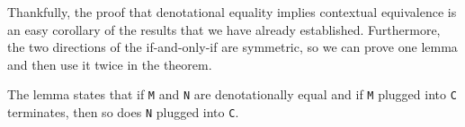 Thankfully, the proof that denotational equality implies contextual
equivalence is an easy corollary of the results that we have already
established. Furthermore, the two directions of the if-and-only-if are
symmetric, so we can prove one lemma and then use it twice in the
theorem.

The lemma states that if \texttt{M} and \texttt{N} are denotationally
equal and if \texttt{M} plugged into \texttt{C} terminates, then so does
\texttt{N} plugged into \texttt{C}.

\begin{fence}
\begin{code}%
\>[0]\AgdaSpace{}%
\AgdaSymbol{:}\AgdaSpace{}%
\AgdaSymbol{\}}\AgdaSpace{}%
\AgdaSymbol{\{}\AgdaSpace{}%
\AgdaSpace{}%
\AgdaSymbol{:}\AgdaSpace{}%
\AgdaSpace{}%
\AgdaSpace{}%
\AgdaSymbol{\}}\AgdaSpace{}%
\AgdaSymbol{\{}\AgdaSpace{}%
\AgdaSymbol{:}\AgdaSpace{}%
\AgdaSpace{}%
\AgdaSpace{}%
\AgdaSymbol{\}}\<%
\\
\>[0][@{}l@{\AgdaIndent{0}}]%
\>[2]%
\>[120I]\AgdaSpace{}%
\AgdaSpace{}%
\AgdaSpace{}%
\AgdaSpace{}%
%
\>[15]%
\>[18]\AgdaSpace{}%
\AgdaSymbol{(}\AgdaSpace{}%
\AgdaSpace{}%
\AgdaSymbol{)}\<%
\\
\>[.][@{}l@{}]\<[120I]%
\>[4]\AgdaComment{-----------------------------------}\<%
\\
%
\>[2]\AgdaSpace{}%
\AgdaSpace{}%
\AgdaSymbol{(}\AgdaSpace{}%
\AgdaSpace{}%
\AgdaSymbol{)}\<%
\\
\>[0]\AgdaSpace{}%
\AgdaSymbol{\{}\AgdaSymbol{\}\{}\AgdaSymbol{\}\{}\AgdaSymbol{\}\{}\AgdaSymbol{\}}\AgdaSpace{}%
\AgdaSpace{}%
\AgdaSpace{}%
\AgdaSpace{}%
\AgdaOperator{\AgdaInductiveConstructor{,}}\AgdaSpace{}%
\AgdaSpace{}%
\AgdaSpace{}%
\AgdaSymbol{=}\<%
\\
\>[0][@{}l@{\AgdaIndent{0}}]%
\>[2]\AgdaSpace{}%

\end{code}
\end{fence}
